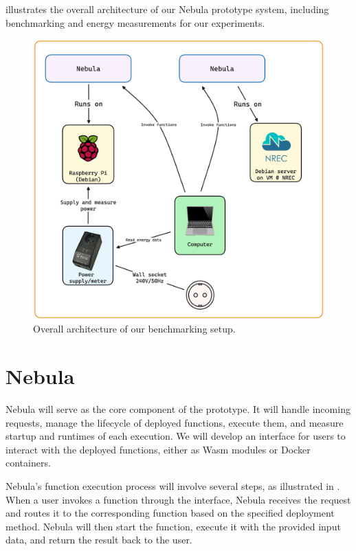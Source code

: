 \documentclass[
  table]{report}
\begin{document}
 illustrates the overall architecture of our
Nebula prototype system, including benchmarking and energy measurements
for our experiments.

\begin{figure}[H]
\centering
  \includegraphics[width=0.7\columnwidth]{assets/5-overall-system-design.png}
  \caption{Overall architecture of our benchmarking setup.}
  \label{fig:system-design}
\end{figure}

\section{Nebula}

Nebula will serve as the core component of the prototype. It will handle
incoming requests, manage the lifecycle of deployed functions, execute
them, and measure startup and runtimes of each execution. We will
develop an interface for users to interact with the deployed functions,
either as \ac{Wasm} modules or Docker containers.

Nebula's function execution process will involve several steps, as
illustrated in . When a user invokes
a function through the interface, Nebula receives the request and routes
it to the corresponding function based on the specified deployment
method. Nebula will then start the function, execute it with the
provided input data, and return the result back to the user.
\end{document}
